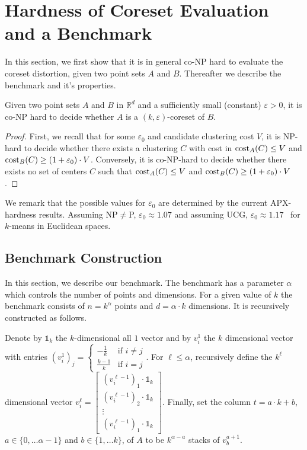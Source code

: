\section{Hardness of Coreset Evaluation and a Benchmark}
\label{sec:coreset-evaluation-hard}
\label{sec:benchmark}

In this section, we first show that it is in general co-NP hard to evaluate the coreset distortion, given two point sets $A$ and $B$. Thereafter we describe the benchmark and it's properties.


\begin{proposition}
Given two point sets $A$ and $B$ in $\mathbb{R}^d$ and a sufficiently small (constant) $\varepsilon>0$, it is co-NP hard to decide whether $A$ is a $(k,\varepsilon)$-coreset of $B$.
\end{proposition}
\begin{proof}
First, we recall that for some $\varepsilon_0$ and candidate clustering cost $V$, it is NP-hard to decide whether there exists a clustering $C$ with cost in $\text{cost}_A(C)\leq V$ and $\text{cost}_B(C)\geq (1+\varepsilon_0)\cdot V$.
Conversely, it is co-NP-hard to decide whether there exists no set of centers $C$ such that $\text{cost}_A(C)\leq V$ and $\text{cost}_B(C) \geq (1+\varepsilon_0)\cdot V$.
\end{proof}

We remark that the possible values for $\varepsilon_0$ are determined by the current APX-hardness results. Assuming NP$\neq$P, $\varepsilon_0\approx 1.07$ and assuming UCG, $\varepsilon_0 \approx 1.17$~\cite{Cohen-AddadSL21,Cohen-AddadS19} for $k$-means in Euclidean spaces.

\subsection{Benchmark Construction}

In this section, we describe our benchmark. The benchmark has a parameter $\alpha$ which controls the number of points and dimensions.
For a given value of $k$ the benchmark consists of $n=k^\alpha$ points and $d=\alpha \cdot k$ dimensions.
It is recursively constructed as follows.

Denote by $\mathds{1}_k$ the $k$-dimensional all $1$ vector and by $v_i^1$ the $k$ dimensional vector with entries $(v_i^1)_j = \begin{cases}-\frac{1}{k} & \text{if } i\neq j\\
\frac{k-1}{k} & \text{if } i= j\end{cases}$.
For $\ell\leq \alpha$, recursively define the $k^{\ell}$ dimensional vector $v_i^{\ell} = \begin{bmatrix}
(v_i^{\ell-1})_1 \cdot \mathds{1}_k \\
(v_i^{\ell-1})_2 \cdot \mathds{1}_k \\
\vdots \\
(v_i^{\ell-1})_1 \cdot \mathds{1}_k
\end{bmatrix}$. Finally, set the column $t = a\cdot k + b$, $a\in \{0,\ldots \alpha-1\}$ and $b \in \{1,\ldots k\}$, of $A$ to be $k^{\alpha-a}$  stacks of $v_b^{a+1}$.


